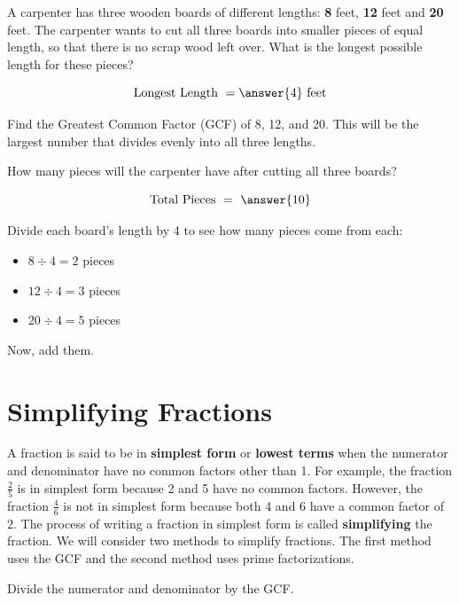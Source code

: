 \documentclass{ximera}[font=12pt]  %
\begin{document}
\begin{problem}
  A carpenter has three wooden boards of different lengths: \textbf{8} feet, \textbf{12} feet and
      \textbf{20} feet.  The carpenter wants to cut all three boards into smaller pieces of equal length,
       so that there is no scrap wood left over. What is the longest possible length for these pieces?

  \[ \textrm{Longest Length } = \answer{4} \ \textrm{feet} \] 

  \begin{hint}
    Find the Greatest Common Factor (GCF) of 8, 12, and 20. This will be the largest number that divides evenly into all three lengths.
  \end{hint}

How many pieces will the carpenter have after cutting all three boards?

  \[ \textrm{Total Pieces } = \ \answer{10} \] 

  \begin{hint}
    Divide each board's length by 4 to see how many pieces come from each:
    \begin{itemize}
        \item $8 \div 4 = 2$ pieces
        \item $12 \div 4 = 3$ pieces
        \item $20 \div 4 = 5$ pieces
    \end{itemize}
    Now, add them.
  \end{hint}
\end{problem}


\section*{Simplifying Fractions}

A fraction is said to be in \textbf{simplest form} or \textbf{lowest terms} when the
numerator and denominator have no common factors other than 1.  For example, the fraction
$\textstyle \frac{2}{5}$ is in simplest form because 2 and 5 have no common factors.  However, the fraction
$\textstyle \frac{4}{6}$ is not in simplest form because both 4 and 6 have a common factor of 2.  The
process of writing a fraction in simplest form is called \textbf{simplifying} the fraction.  We will consider two methods 
to simplify fractions.  The first method uses the GCF and the second method uses prime factorizations.

\begin{procedure}

    Divide the numerator and denominator by the GCF.

\end{procedure}
\end{document}
